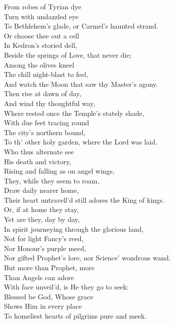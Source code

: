 From robes of Tyrian dye \\
 Turn with undazzled eye \\
 To Bethlehem’s glade, or Carmel’s haunted strand. \\
  Or choose thee out a cell \\
 In Kedron’s storied dell, \\
 Beside the springs of Love, that never die; \\
 Among the olives kneel \\
 The chill night-blast to feel, \\
 And watch the Moon that saw thy Master’s agony. \\
  Then rise at dawn of day, \\
 And wind thy thoughtful way, \\
 Where rested once the Temple’s stately shade, \\
 With due feet tracing round \\
 The city’s northern bound, \\
 To th’ other holy garden, where the Lord was laid. \\
  Who thus alternate see \\
 His death and victory, \\
 Rising and falling as on angel wings, \\
 They, while they seem to roam, \\
 Draw daily nearer home, \\
 Their heart untravell’d still adores the King of kings. \\
  Or, if at home they stay, \\
 Yet are they, day by day, \\
 In spirit journeying through the glorious land, \\
 Not for light Fancy’s reed, \\
 Nor Honour’s purple meed, \\
 Nor gifted Prophet’s lore, nor Science’ wondrous wand. \\
  But more than Prophet, more \\
 Than Angels can adore \\
 With face unveil’d, is He they go to seek: \\
 Blessed be God, Whose grace \\
 Shows Him in every place \\
 To homeliest hearts of pilgrims pure and meek.\\


